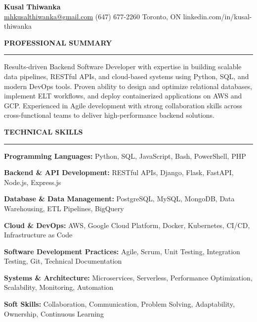 \documentclass[10pt,letterpaper]{article}
\begin{document}
\begin{center}
{\LARGE\textbf{Kusal Thiwanka}}\\[3pt]
\href{mailto:mhkusalthiwanka@gmail.com}{mhkusalthiwanka@gmail.com}\hspace{2em}%
(647) 677{-}2260\hspace{2em}%
Toronto, ON\hspace{2em}
linkedin.com/in/kusal-thiwanka
\end{center}

\vspace{6pt}

\textbf{PROFESSIONAL SUMMARY}\\[-8pt]
\noindent\rule{\textwidth}{1pt}

\vspace{-2pt}

Results-driven Backend Software Developer with expertise in building scalable data pipelines, RESTful APIs, and cloud-based systems using Python, SQL, and modern DevOps tools. Proven ability to design and optimize relational databases, implement ELT workflows, and deploy containerized applications on AWS and GCP. Experienced in Agile development with strong collaboration skills across cross-functional teams to deliver high-performance backend solutions.

\vspace{8pt}

\textbf{TECHNICAL SKILLS}\\[-8pt]
\noindent\rule{\textwidth}{1pt}

\vspace{-2pt}

\textbf{Programming Languages:} Python, SQL, JavaScript, Bash, PowerShell, PHP

\textbf{Backend \& API Development:} RESTful APIs, Django, Flask, FastAPI, Node.js, Express.js

\textbf{Database \& Data Management:} PostgreSQL, MySQL, MongoDB, Data Warehousing, ETL Pipelines, BigQuery

\textbf{Cloud \& DevOps:} AWS, Google Cloud Platform, Docker, Kubernetes, CI/CD, Infrastructure as Code

\textbf{Software Development Practices:} Agile, Scrum, Unit Testing, Integration Testing, Git, Technical Documentation

\textbf{Systems \& Architecture:} Microservices, Serverless, Performance Optimization, Scalability, Monitoring, Automation

\textbf{Soft Skills:} Collaboration, Communication, Problem Solving, Adaptability, Ownership, Continuous Learning
\end{document}
